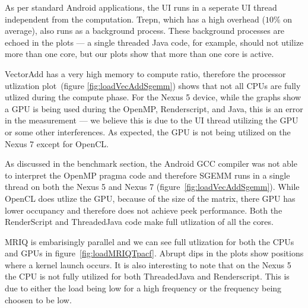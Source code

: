 As per standard Android applications, the UI runs in a seperate UI thread 
  independent from the computation.
Trepn, which has a high overhead ($10\%$ on average), also runs as a background
  process.
These background processes are echoed in
  the plots --- a single threaded Java code, for example, should not utilize more than one core, but our plots show that more than one core is active.


VectorAdd has a very high memory to compute ratio, therefore the processor utlization
  plot~(figure \ref{fig:loadVecAddSgemm}) shows that not all CPUs 
  are fully utlized during the compute phase.
For the Nexus 5 device, while the graphs show a GPU is being used during the OpenMP,
  Renderscript, and Java, this is an error in the measurement --- we believe this is 
  due to the UI thread utilizing the GPU or some other interferences.
As expected, the GPU is not being utilized on the Nexus 7 except for OpenCL.

As discussed in the benchmark section, the Android GCC compiler was not able 
  to interpret the OpenMP pragma code and therefore SGEMM runs in a single thread
  on both the Nexus 5 and Nexus 7 (figure~\ref{fig:loadVecAddSgemm}).
While OpenCL does utlize the GPU, because of the size of the matrix, there GPU has
  lower occupancy and therefore does not achieve peek performance.
Both the RenderScript and ThreadedJava code make full utlization of all the cores.

MRIQ is embarisingly parallel and we can see full utlization for both the CPUs and GPUs in figure~\ref{fig:loadMRIQTpacf}.
Abrupt dips in the plots show positions where a kernel launch occurs.
It is also interesting to note that on the Nexus 5 the CPU is not fully utilized for both ThreadedJava and Renderscript.
This is due to either the load being low for a high frequency or the frequency being 
  choosen to be low.


